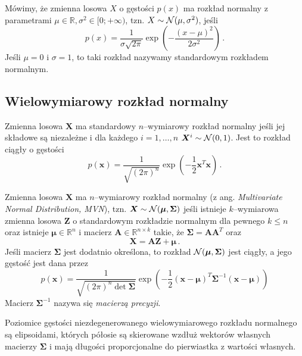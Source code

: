 \documentclass{myclass}
\numberwithin{equation}{subsection}
\begin{document}
\begin{definition}
Mówimy, że zmienna losowa \(X\) o gęstości \(p(x)\) ma rozkład normalny z parametrami \(\mu \in
\mathbb{R} , \sigma^2 \in [0;+\infty)\), tzn. \(X \sim \mathcal{N}(\mu,\sigma^2)\), jeśli    
\[
p(x) = \frac{1}{\sigma\sqrt{2 \pi}} \exp\left(-\frac{(x-\mu)^2}{2\sigma^2}\right)\,.
\]
Jeśli \(\mu=0\) i \(\sigma=1\), to taki rozkład nazywamy standardowym rozkładem normalnym.
\end{definition}


\subsection{Wielowymiarowy rozkład normalny}

\begin{definition}
Zmienna losowa \(\bm{X}\) ma standardowy \(n\)--wymiarowy rozkład normalny jeśli jej składowe są
niezależne i dla każdego \(i=1,\ldots,n\) \(\bm{X}^i \sim \mathcal{N}(0,1)\). Jest to rozkład ciągły o
gęstości
\[
p(\bm{x}) = \frac{1}{\sqrt{(2\pi)^n}}\exp\left(-\frac{1}{2}\bm{x}^T\bm{x}\right)\,.
\]
\end{definition}

\begin{definition}
Zmienna losowa \(\bm{X}\) ma \(n\)--wymiarowy rozkład normalny (z ang. \textit{Multivariate Normal
Distribution, MVN}), tzn. \(\bm{X} \sim \mathcal{N}(\bm{\mu}, \bm{\Sigma})\) jeśli istnieje
\(k\)--wymiarowa zmienna losowa \(\bm{Z}\) o standardowym rozkładzie normalnym dla pewnego \(k \leq
n\) oraz istnieje \(\bm{\mu} \in \mathbb{R}^n\) i macierz \(\bm{A} \in \mathbb{R}^{n \times k}\)
takie, że \(\bm{\Sigma} = \bm{A}\bm{A}^T\) oraz
\[
\bm{X} = \bm{A}\bm{Z} + \bm{\mu}\,.
\]
Jeśli macierz \(\bm{\Sigma}\) jest dodatnio określona, to rozkład \(\mathcal{N}(\bm{\mu}, \bm{\Sigma})\)
jest ciągły, a jego gęstość jest dana przez
\[
p(\bm{x}) = \frac{1}{\sqrt{(2\pi)^n\det\bm{\Sigma}}}\exp\left(-\frac{1}{2}(\bm{x}-\bm{\mu})^T\bm{\Sigma}^{-1}(\bm{x}-\bm{\mu})\right)
\]
Macierz \(\bm{\Sigma}^{-1}\) nazywa się \emph{macierzą precyzji}.
\end{definition}

Poziomice gęstości niezdegenerowanego wielowymiarowego rozkładu normalnego są elipsoidami, których
półosie są skierowane wzdłuż wektorów własnych macierzy \(\bm{\Sigma}\) i mają długości
proporcjonalne do pierwiastka z wartości własnych.
\end{document}
